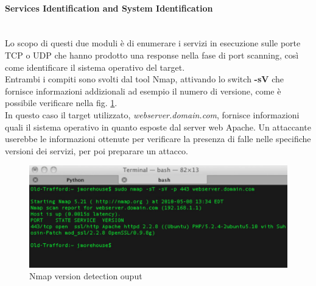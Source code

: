 \paragraph{Services Identification and System Identification}\mbox{}\\
Lo scopo di questi due moduli è di enumerare i servizi in esecuzione sulle porte TCP o UDP che hanno prodotto una response nella fase di port scanning, così come identificare il sistema operativo del target.\\
Entrambi i compiti sono svolti dal tool Nmap, attivando lo switch \textbf{-sV} che fornisce informazioni addizionali ad esempio il numero di versione, come è possibile verificare nella fig. \ref{nmap_sv_img}.\\
In questo caso il target utilizzato, \emph{webserver.domain.com}, fornisce informazioni quali il sistema operativo in quanto esposte dal server web Apache. Un attaccante userebbe le informazioni ottenute per verificare la presenza di falle nelle specifiche versioni dei servizi, per poi preparare un attacco.
\begin{figure}[hbtp]
	\centering
	\includegraphics[scale=.3]{imgs/attack/nmap_sv.png}
	\caption{Nmap version detection ouput}
	\label{nmap_sv_img}
\end{figure}

